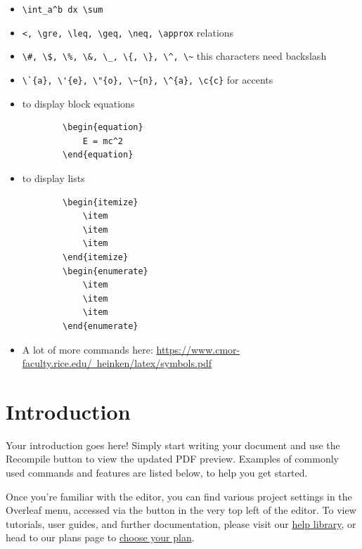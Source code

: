 \documentclass{article}
\begin{document}
\begin{itemize}
    \item \verb|\int_a^b dx \sum|
    \item \verb|<, \gre, \leq, \geq, \neq, \approx| relations
    \item \verb|\#, \$, \%, \&, \_, \{, \}, \^, \~| this characters need backslash
    \item \verb|\`{a}, \'{e}, \"{o}, \~{n}, \^{a}, \c{c}| for accents
    \item to display block equations
    \begin{verbatim}
        \begin{equation}
            E = mc^2
        \end{equation}
    \end{verbatim}
    \item to display lists
    \begin{verbatim}
        \begin{itemize}
            \item
            \item
            \item
        \end{itemize}
        \begin{enumerate}
            \item
            \item
            \item
        \end{enumerate}
    \end{verbatim}
    \item A lot of more commands here: \href{https://www.cmor-faculty.rice.edu/~heinken/latex/symbols.pdf}{https://www.cmor-faculty.rice.edu/~heinken/latex/symbols.pdf}
\end{itemize}

\section{Introduction}

Your introduction goes here! Simply start writing your document and use the Recompile button to view the updated PDF preview. Examples of commonly used commands and features are listed below, to help you get started.

Once you're familiar with the editor, you can find various project settings in the Overleaf menu, accessed via the button in the very top left of the editor. To view tutorials, user guides, and further documentation, please visit our \href{https://www.overleaf.com/learn}{help library}, or head to our plans page to \href{https://www.overleaf.com/user/subscription/plans}{choose your plan}.
\end{document}
